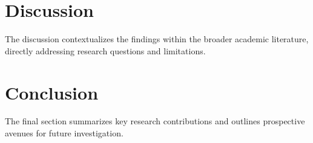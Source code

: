 \documentclass[conference]{IEEEtran}
\begin{document}
\section{Discussion}
The discussion contextualizes the findings within the broader academic literature, directly addressing research questions and limitations.

\section{Conclusion}
The final section summarizes key research contributions and outlines prospective avenues for future investigation.



\end{document}
